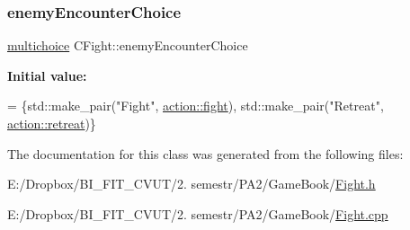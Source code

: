 \subsubsection{\texorpdfstring{enemy\+Encounter\+Choice}{enemyEncounterChoice}}
{\footnotesize\ttfamily \mbox{\hyperlink{_game_menus_8h_acdb545ed67596d0840e35ed209fecbe9}{multichoice}} C\+Fight\+::enemy\+Encounter\+Choice\hspace{0.3cm}{\ttfamily [protected]}}

{\bfseries Initial value\+:}
\begin{DoxyCode}
= \{std::make\_pair(\textcolor{stringliteral}{"Fight"}, \mbox{\hyperlink{_actions_list_8h_a2f4ab7bf743142dae2e459aa18f9f1d4a9e6417ebffecef071eaeeb2ed0ca654b}{action::fight}}),
                                        std::make\_pair(\textcolor{stringliteral}{"Retreat"}, 
      \mbox{\hyperlink{_actions_list_8h_a2f4ab7bf743142dae2e459aa18f9f1d4af067f15883375d237eb36bca4f5900fb}{action::retreat}})\}
\end{DoxyCode}


The documentation for this class was generated from the following files\+:\begin{DoxyCompactItemize}
\item 
E\+:/\+Dropbox/\+B\+I\+\_\+\+F\+I\+T\+\_\+\+C\+V\+U\+T/2. semestr/\+P\+A2/\+Game\+Book/\mbox{\hyperlink{_fight_8h}{Fight.\+h}}\item 
E\+:/\+Dropbox/\+B\+I\+\_\+\+F\+I\+T\+\_\+\+C\+V\+U\+T/2. semestr/\+P\+A2/\+Game\+Book/\mbox{\hyperlink{_fight_8cpp}{Fight.\+cpp}}\end{DoxyCompactItemize}

